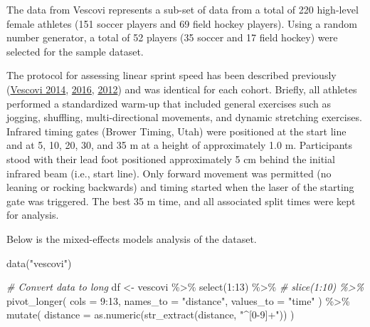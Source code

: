 \documentclass[fleqn,10pt,lineno]{wlpeerj} %
\newenvironment{Shaded}{\begin{snugshade}}{\end{snugshade}}
\newcommand{\AttributeTok}[1]{\textcolor[rgb]{0.77,0.63,0.00}{#1}}
\newcommand{\CommentTok}[1]{\textcolor[rgb]{0.56,0.35,0.01}{\textit{#1}}}
\newcommand{\DecValTok}[1]{\textcolor[rgb]{0.00,0.00,0.81}{#1}}
\newcommand{\FunctionTok}[1]{\textcolor[rgb]{0.00,0.00,0.00}{#1}}
\newcommand{\NormalTok}[1]{#1}
\newcommand{\OtherTok}[1]{\textcolor[rgb]{0.56,0.35,0.01}{#1}}
\newcommand{\SpecialCharTok}[1]{\textcolor[rgb]{0.00,0.00,0.00}{#1}}
\newcommand{\StringTok}[1]{\textcolor[rgb]{0.31,0.60,0.02}{#1}}
\begin{document}
The data from Vescovi represents a sub-set of data from a total of 220 high-level female athletes (151 soccer players and 69 field hockey players). Using a random number generator, a total of 52 players (35 soccer and 17 field hockey) were selected for the sample dataset.

The protocol for assessing linear sprint speed has been described previously (\protect\hyperlink{ref-vescoviImpactMaximumSpeed2014}{Vescovi 2014}, \protect\hyperlink{ref-vescoviLocomotorHeartRateMetabolic2016}{2016}, \protect\hyperlink{ref-vescoviSprintSpeedCharacteristics2012}{2012}) and was identical for each cohort. Briefly, all athletes performed a standardized warm-up that included general exercises such as jogging, shuffling, multi-directional movements, and dynamic stretching exercises. Infrared timing gates (Brower Timing, Utah) were positioned at the start line and at 5, 10, 20, 30, and 35 m at a height of approximately 1.0 m. Participants stood with their lead foot positioned approximately 5 cm behind the initial infrared beam (i.e., start line). Only forward movement was permitted (no leaning or rocking backwards) and timing started when the laser of the starting gate was triggered. The best 35 m time, and all associated split times were kept for analysis.

Below is the mixed-effects models analysis of the dataset.

\begin{Shaded}
\begin{Highlighting}[]
\FunctionTok{data}\NormalTok{(}\StringTok{"vescovi"}\NormalTok{)}

\CommentTok{\# Convert data to long}
\NormalTok{df }\OtherTok{\textless{}{-}}\NormalTok{ vescovi }\SpecialCharTok{\%\textgreater{}\%}
  \FunctionTok{select}\NormalTok{(}\DecValTok{1}\SpecialCharTok{:}\DecValTok{13}\NormalTok{) }\SpecialCharTok{\%\textgreater{}\%}
  \CommentTok{\# slice(1:10) \%\textgreater{}\%}
  \FunctionTok{pivot\_longer}\NormalTok{(}
    \AttributeTok{cols =} \DecValTok{9}\SpecialCharTok{:}\DecValTok{13}\NormalTok{,}
    \AttributeTok{names\_to =} \StringTok{"distance"}\NormalTok{,}
    \AttributeTok{values\_to =} \StringTok{"time"}
\NormalTok{  ) }\SpecialCharTok{\%\textgreater{}\%}
  \FunctionTok{mutate}\NormalTok{(}
    \AttributeTok{distance =} \FunctionTok{as.numeric}\NormalTok{(}\FunctionTok{str\_extract}\NormalTok{(distance, }\StringTok{"\^{}[0{-}9]+"}\NormalTok{))}
\NormalTok{  )}
\end{Highlighting}
\end{Shaded}
\end{document}
